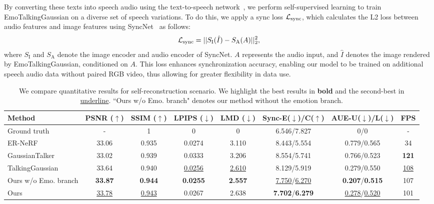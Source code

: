 By converting these texts into speech audio using the text-to-speech network~\cite{gTTS}, we perform self-supervised learning to train EmoTalkingGaussian on a diverse set of speech variations. To do this, we apply a sync loss 
$\mathcal{L}_\text{sync}$, which calculates the L2 loss between audio features and image features using SyncNet~\cite{chung2017out} as follows:
\begin{eqnarray}
    \mathcal{L}_\text{sync} = || S_\text{I} (\hat{I}) - S_\text{A} (A) ||^2_2, 
    \label{eq:sync_loss}
\end{eqnarray}
where $S_\text{I}$ and $S_\text{A}$ denote the image encoder and audio encoder of SyncNet. $A$ represents the audio input, and $\hat{I}$ denotes the image rendered by EmoTalkingGaussian, conditioned on $A$. This loss enhances synchronization accuracy, enabling our model to be trained on additional speech audio data without paired RGB video, thus allowing for greater flexibility in data use.

\begin{table*}[t]
    \centering
    \begin{tabular}{l|ccccccc}
    \hline
    Method & PSNR ($\uparrow$) & SSIM ($\uparrow$) & LPIPS ($\downarrow$) & LMD ($\downarrow$) & Sync-E($\downarrow$)/C($\uparrow$) & AUE-U($\downarrow$)/L($\downarrow$) 
    & FPS\\
    \hline
    Ground truth & - & 1 & 0 & 0 & 6.546/7.827 & 0/0 & - \\
    \hline
    ER-NeRF~\cite{li2023efficient} & 33.06 & 0.935 & 0.0274 & 3.110 & 8.443/5.554 & 0.779/0.565 & 34 \\
    GaussianTalker~\cite{cho2024gaussiantalker} & 33.02 & 0.939 & 0.0333 & 3.206 &  8.554/5.741 & 0.766/0.523 & \textbf{121} \\
    TalkingGaussian~\cite{li2024talkinggaussian} & 33.64 & 0.940 & \underline{0.0256} & \underline{2.610} & 8.129/5.919 & 0.279/0.550 & \underline{108} \\
    \hline
    Ours w/o Emo. branch & \textbf{33.87} & \textbf{0.944} & \textbf{0.0255} & \textbf{2.557} & \underline{7.750}/\underline{6.270} & \textbf{0.207}/\textbf{0.515} & 107 \\
    Ours & \underline{33.78} & \underline{0.943} & 0.0267 & 2.638 & \textbf{7.702}/\textbf{6.279} & \underline{0.278}/\underline{0.520} & 101 \\
    \hline
    \end{tabular}
    \caption{We compare quantitative results for self-reconstruction scenario. We highlight the best results in \textbf{bold} and the second-best in \underline{underline}. ``Ours w/o Emo. branch" denotes our method without the emotion branch.}
    \label{tab:scenario 1}
    \vspace{-3mm}
\end{table*}

